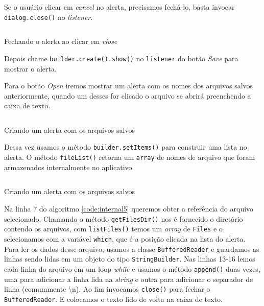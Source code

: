 \documentclass[a4paper,12pt,brazil]{book}
\begin{document}
\begin{singlespace}
		Se o usuário clicar em \emph{cancel} no alerta, precisamos fechá-lo, basta invocar \texttt{dialog.close()} no \emph{listener}.

		\begin{listing}[H]
		\inputminted[linenos=true,fontsize=\small,frame=lines, framesep=2mm, tabsize=2,numbersep=5pt]{java}{src/api/storage/internal3.java}
		\caption{Fechando o alerta ao clicar em \emph{close}}
		\label{code:internal3}
		\end{listing} 	

		Depois chame \texttt{builder.create().show()} no \texttt{listener} do botão \emph{Save} para mostrar o alerta.
 
		Para o botão \emph{Open} iremos mostrar um alerta com os nomes dos arquivos salvos anteriormente, quando um desses for clicado o arquivo se abrirá preenchendo a caixa de texto.

		\begin{listing}[H]
		\inputminted[linenos=true,fontsize=\small,frame=lines, framesep=2mm, tabsize=2,numbersep=5pt]{java}{src/api/storage/internal4.java}
		\caption{Criando um alerta com os arquivos salvos}
		\label{code:internal4}
		\end{listing} 	
	
		Dessa vez usamos o método \texttt{builder.setItems()} para construir uma lista no alerta. O método \texttt{fileList()} retorna um \texttt{array} de nomes de arquivo que foram armazenados internalmente no aplicativo. 

		\begin{listing}[H]
		\inputminted[linenos=true,fontsize=\small,frame=lines, framesep=2mm, tabsize=2,numbersep=5pt]{java}{src/api/storage/internal5.java}
		\caption{Criando um alerta com os arquivos salvos}
		\label{code:internal5}
		\end{listing} 	
		
		Na linha 7 do algoritmo \ref{code:internal5} queremos obter a referência do arquivo selecionado. Chamando o método \texttt{getFilesDir()} nos é fornecido o diretório contendo os arquivos, com \texttt{listFiles()} temos um \emph{array} de \texttt{Files} e o selecionamos com a variável \texttt{which}, que é a posição clicada na lista do alerta. Para ler os dados desse arquivo, usamos a classe \texttt{BufferedReader} e guardamos as linhas sendo lidas em um objeto do tipo \texttt{StringBuilder}. Nas linhas 13-16 lemos cada linha do arquivo em um loop \emph{while} e usamos o método \texttt{append()} duas vezes, uma para adicionar a linha lida na \emph{string} e outra para adicionar o separador de linha (comummente \textbackslash n). Ao fim invocamos \texttt{close()} para fechar o \texttt{BufferedReader}. E colocamos o texto lido de volta na caixa de texto.


\end{singlespace}
\end{document}
